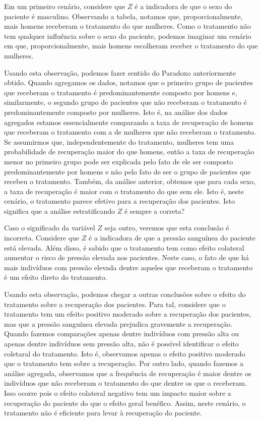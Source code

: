 Em um primeiro cenário, considere que $Z$ é a indicadora de que
o sexo do paciente é masculino.
Observando a tabela, notamos que, proporcionalmente, 
mais homens receberam o tratamento do que mulheres.
Como o tratamento não tem qualquer influência sobre o sexo do paciente,
podemos imaginar um cenário em que, proporcionalmente,
mais homens escolheram receber o tratamento do que mulheres.

Usando esta observação,
podemos fazer sentido do Paradoxo anteriormente obtido.
Quando agregamos os dados,
notamos que o primeiro grupo de pacientes que 
receberam o tratamento é predominantemente composto por homens e,
similarmente, o segundo grupo de 
pacientes que não receberam o tratamento é
predominantemente composto por mulheres.
Isto é, na análise dos dados agregados estamos 
essencialmente comparando a taxa de recuperação de homens 
que receberam o tratamento com
a de mulheres que não receberam o tratamento.
Se assumirmos que, independentemente do tratamento, 
mulheres tem uma probabilidade de recuperação maior do que homens,
então a taxa de recuperação menor no primeiro grupo pode ser explicada
pelo fato de ele ser composto predominantemente por homens e
não pelo fato de ser o grupo de pacientes que recebeu o tratamento.
Também, da análise anterior, obtemos que para cada sexo, 
a taxa de recuperação é maior com o tratamento  do que sem ele. 
Isto é, neste cenário, o tratamento parece efetivo para
a recuperação dos pacientes.
Isto significa que a análise estratificando $Z$ é sempre a correta?

Caso o significado da variável $Z$ seja outro, veremos que 
esta conclusão é incorreta.
Considere que $Z$ é a indicadora de que 
a pressão sanguínea do paciente está elevada.
Além disso, é sabido que o tratamento tem como
efeito colateral aumentar o risco de
pressão elevada nos pacientes.
Neste caso, o fato de que
há mais indivíduos com pressão elevada dentre aqueles que
receberam o tratamento é
um efeito direto do tratamento.

Usando esta observação,
podemos chegar a outras conclusões sobre o
efeito do tratamento sobre a recuperação dos pacientes.
Para tal, considere que o tratamento tem
um efeito positivo moderado sobre a recuperação dos pacientes,
mas que a pressão sanguínea elevada prejudica gravemente a recuperação.
Quando fazemos comparações apenas dentre indivíduos com pressão alta ou
apenas dentre indivíduos sem pressão alta, 
não é possível identificar o efeito coletaral do tratamento.
Isto é, observamos apenas
o efeito positivo moderado que o tratamento tem sobre a recuperação.
Por outro lado, quando fazemos a análise agregada,
observamos que a frequência de recuperação é 
maior dentre os indivíduos que não receberam o tratamento
do que dentre os que o receberam.
Isso ocorre pois o efeito colateral negativo tem um impacto
maior sobre a recuperação do paciente do que o efeito geral benéfico.
Assim, neste cenário, o tratamento não é
eficiente para levar à recuperação do paciente.

